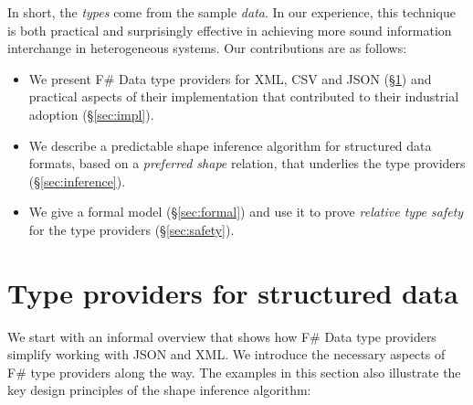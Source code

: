 \documentclass[10pt,nocopyrightspace]{sigplanconf}
\begin{document}
In short, the \emph{types} come from the sample \emph{data}. In our experience, this technique is
both practical and surprisingly effective in achieving more sound information interchange
in heterogeneous systems. Our contributions are as follows:

\begin{itemize}
\item We present F\# Data type providers for XML, CSV and JSON (\S\ref{sec:providers})
  and practical aspects of their implementation that contributed to their industrial
  adoption (\S\ref{sec:impl}).

\item We describe a predictable shape inference algorithm for structured data formats,
  based on a \emph{preferred shape} relation, that underlies the type providers
  (\S\ref{sec:inference}).

\item We give a formal model (\S\ref{sec:formal}) and use it to prove
  \emph{relative type safety} for the type providers (\S\ref{sec:safety}).
\end{itemize}



%
%

\section{Type providers for structured data}
\label{sec:providers}

We start with an informal overview that shows how F\# Data type providers simplify working with
JSON and XML. We introduce the necessary aspects of F\# type providers along the way. The examples
in this section also illustrate the key design principles of the shape inference algorithm:
\end{document}
